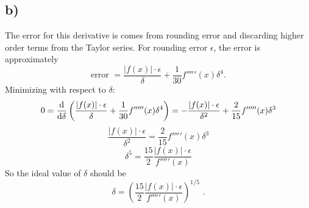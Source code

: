 \documentclass{article}
\newcommand{\<}[1]{\left\langle #1 \right\rangle }
\begin{document}
\subsection{b)}
The error for this derivative is comes from rounding error and discarding higher order terms from the Taylor series. For rounding error $\epsilon$, the error is approximately 
\[\text{error } = \frac{|f(x)|\cdot\epsilon}{\delta} + \frac{1}{30}f'''''(x)\delta^4 \text{.}\]
Minimizing with respect to $\delta$:
\[0 = \dv{}{\delta}\left( \frac{|f(x)|\cdot\epsilon}{\delta} + \frac{1}{30}f'''''(x)\delta^4 \right) = -\frac{|f(x)|\cdot \epsilon}{\delta^2} + \frac{2}{15}f'''''(x)\delta^3\]
\[\frac{|f(x)|\cdot \epsilon}{\delta^2} = \frac{2}{15}f'''''(x)\delta^3\]
\[\delta^5 = \frac{15}{2}\frac{|f(x)|\cdot \epsilon}{f'''''(x)}\]
So the ideal value of $\delta$ should be 
\[\boxed{ \delta = \left(\frac{15}{2}\frac{|f(x)|\cdot \epsilon}{f'''''(x)}\right)^{1/5} }\text{ .}\]
\end{document}
